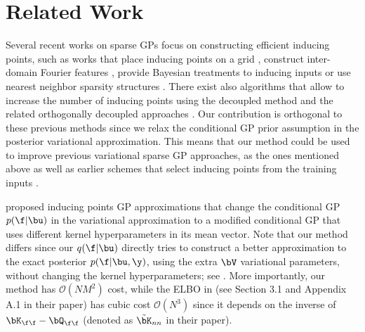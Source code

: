 \section{Related Work
\label{sec:relatedwork}
}


Several recent works on sparse GPs focus on constructing  efficient inducing points, such as works that place inducing points on a grid \citep{wilson2015kernel,evans2018scalable,gardner2018product}, construct inter-domain Fourier features \cite{ hensmanetal2018}, provide Bayesian treatments to inducing inputs \cite{rossi21a}
or use nearest neighbor 
sparsity structures
\cite{tran21a, wu22h}.
There exist also algorithms that  allow to increase the number of inducing points using the decoupled method \citep{cheng2017variational, havasi2018deep}
and the related orthogonally decoupled approaches 
\citep{salimbeni2018orthogonally, shietal2020, sun2021, tiao2023}. 
Our contribution is orthogonal to these previous methods since 
we relax the conditional GP
prior
assumption in the posterior variational approximation. This means that our method could be used to improve previous variational sparse GP approaches,
as the  ones mentioned above as well as earlier schemes that select inducing points from the training inputs \cite{Cao2013,Chai12,Schreiter2016}. 

\citet{XinranZhu2023} proposed 
inducing points GP approximations that change the conditional GP $p(\f | \bu)$ in the variational approximation to a modified conditional GP that uses different kernel hyperparameters in its mean vector. 
Note that our method differs since
our $q(\f | \bu)$ directly tries to 
construct a better approximation to the exact posterior
$p(\f | \bu, \y)$, using the extra $\bV$ variational parameters, 
without changing the kernel hyperparameters; see . More 
importantly, our method has $\mathcal{O}(N M^2)$ cost, while the ELBO in  \citet{XinranZhu2023} (see Section 3.1 and Appendix A.1 in their paper) has cubic cost $\mathcal{O}(N^3)$ since it depends
on the inverse of $\bK_{\f \f} - \bQ_{\f \f}$ (denoted as $\tilde{\bK}_{nn}$ in their paper).  %

